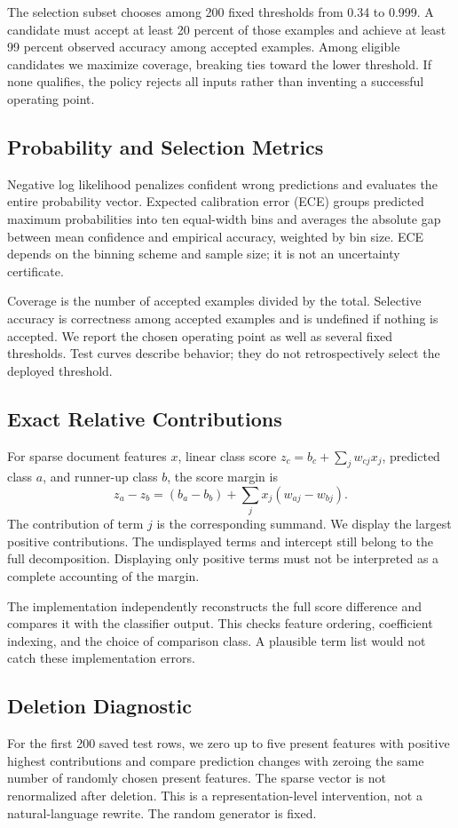 \documentclass[11pt]{article}
\begin{document}
The selection subset chooses among 200 fixed thresholds from 0.34 to 0.999. A candidate must accept at least 20 percent of those examples and achieve at least 99 percent observed accuracy among accepted examples. Among eligible candidates we maximize coverage, breaking ties toward the lower threshold. If none qualifies, the policy rejects all inputs rather than inventing a successful operating point.

\subsection{Probability and Selection Metrics}
Negative log likelihood penalizes confident wrong predictions and evaluates the entire probability vector. Expected calibration error (ECE) groups predicted maximum probabilities into ten equal-width bins and averages the absolute gap between mean confidence and empirical accuracy, weighted by bin size. ECE depends on the binning scheme and sample size; it is not an uncertainty certificate.

Coverage is the number of accepted examples divided by the total. Selective accuracy is correctness among accepted examples and is undefined if nothing is accepted. We report the chosen operating point as well as several fixed thresholds. Test curves describe behavior; they do not retrospectively select the deployed threshold.

\subsection{Exact Relative Contributions}
For sparse document features $x$, linear class score $z_c=b_c+\sum_jw_{cj}x_j$, predicted class $a$, and runner-up class $b$, the score margin is
\begin{equation}
z_a-z_b=(b_a-b_b)+\sum_jx_j(w_{aj}-w_{bj}).
\end{equation}
The contribution of term $j$ is the corresponding summand. We display the largest positive contributions. The undisplayed terms and intercept still belong to the full decomposition. Displaying only positive terms must not be interpreted as a complete accounting of the margin.

The implementation independently reconstructs the full score difference and compares it with the classifier output. This checks feature ordering, coefficient indexing, and the choice of comparison class. A plausible term list would not catch these implementation errors.

\subsection{Deletion Diagnostic}
For the first 200 saved test rows, we zero up to five present features with positive highest contributions and compare prediction changes with zeroing the same number of randomly chosen present features. The sparse vector is not renormalized after deletion. This is a representation-level intervention, not a natural-language rewrite. The random generator is fixed.
\end{document}

